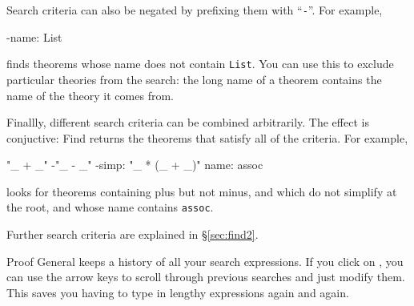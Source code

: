 \begin{isabellebody}
\begin{isamarkuptext}
Search criteria can also be negated by prefixing them with ``\texttt{-}''.
For example,
\begin{ttbox}
-name: List
\end{ttbox}
finds theorems whose name does not contain \texttt{List}. You can use this
to exclude particular theories from the search: the long name of
a theorem contains the name of the theory it comes from.

Finallly, different search criteria can be combined arbitrarily. 
The effect is conjuctive: Find returns the theorems that satisfy all of
the criteria. For example,
\begin{ttbox}
"_ + _"  -"_ - _"  -simp: "_ * (_ + _)"  name: assoc
\end{ttbox}
looks for theorems containing plus but not minus, and which do not simplify
\mbox{} at the root, and whose name contains \texttt{assoc}.

Further search criteria are explained in \S\ref{sec:find2}.

\begin{pgnote}
Proof General keeps a history of all your search expressions.
If you click on , you can use the arrow keys to scroll
through previous searches and just modify them. This saves you having
to type in lengthy expressions again and again.
\end{pgnote}%
\end{isamarkuptext}%
\isamarkuptrue%
%
\isadelimtheory
%
\endisadelimtheory
%
\isatagtheory
%
\endisatagtheory
{\isafoldtheory}%
%
\isadelimtheory
%
\endisadelimtheory
\end{isabellebody}%
